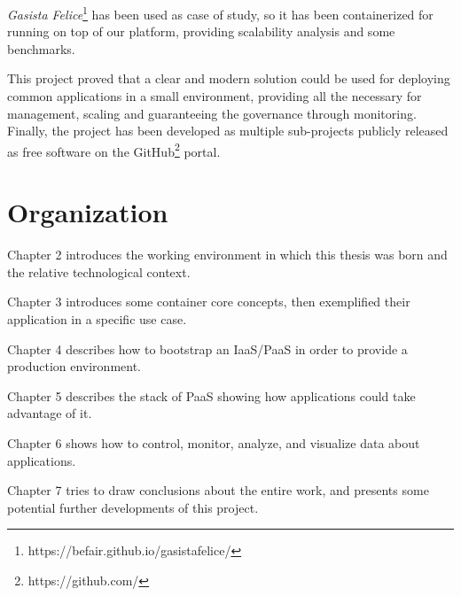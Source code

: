 \textit{Gasista Felice}\footnote{https://befair.github.io/gasistafelice/} has been used as case of study, so it has been containerized for running on top of our platform, providing scalability analysis and some benchmarks.

This project proved that a clear and modern solution could be used for deploying common applications in a small environment, providing all the necessary for management, scaling and guaranteeing the governance through monitoring.  Finally, the project has been developed as multiple sub-projects publicly released as free software on the GitHub\footnote{https://github.com/} portal.

\section{Organization}\label{organization}

Chapter 2 introduces the working environment in which this thesis was born and the relative technological context.

Chapter 3 introduces some container core concepts, then exemplified their application in a specific use case.

Chapter 4 describes how to bootstrap an IaaS/PaaS in order to provide a production environment.

Chapter 5 describes the stack of PaaS showing how applications could take advantage of it.

Chapter 6 shows how to control, monitor, analyze, and visualize data
about applications.

Chapter 7 tries to draw conclusions about the entire work, and presents some potential further developments of this project.